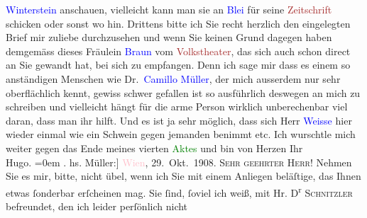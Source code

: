                   \textcolor{blue}{Winterstein}{}\ledrightnote{\textcolor{blue}{Alfred von Winterstein}} anschauen, vielleicht kann man sie
               an \textcolor{blue}{Blei}{}\ledrightnote{\textcolor{blue}{Franz Blei}} für seine \textcolor{brown}{Zeitschrift}{} schicken oder sonst wo hin. Drittens bitte ich
               Sie recht herzlich den eingelegten Brief mir zuliebe durchzusehen und wenn Sie keinen
               Grund dagegen haben demgemäss dieses Fräulein \textcolor{blue}{Braun}{}\ledrightnote{\textcolor{blue}{Thekla Maria Braun}} vom \textcolor{brown}{Volkstheater}{}\ledrightnote{\textcolor{brown}{Volkstheater}}, das sich auch schon
               direct an Sie gewandt hat, bei sich zu empfangen. Denn ich sage mir dass es einem so
               anständigen Menschen wie Dr. \textcolor{blue}{Camillo Müller}{}\ledrightnote{\textcolor{blue}{Camillo Müller}}, der
               mich ausserdem nur sehr oberflächlich kennt, gewiss schwer gefallen ist so
               ausführlich deswegen an mich zu schreiben und vielleicht hängt für die arme Person
               wirklich unberechenbar viel daran, dass man ihr hilft. Und es ist ja sehr möglich,
               dass sich Herr \textcolor{blue}{Weisse}{}\ledrightnote{\textcolor{blue}{Adolf Weisse}} hier wieder einmal wie ein
               Schwein gegen jemanden benimmt etc.\pend
           \pstart
           Ich wurschtle mich weiter gegen das Ende meines vierten \textcolor{green}{Aktes}{} und bin \pend
           \pstart
           von Herzen Ihr{\\[\baselineskip]}\spacefill\mbox{Hugo.}\pend
           \leftskip=0em{}\pstart
           \noindent{}\label{K_L01796_1v}\label{K_L01796_1h}.\pend
           {\bigskip}\pstart
           \raggedleft{}{\pb}{[}hs. Müller:{]} \textcolor{pink}{Wien}{}\ledrightnote{\textcolor{pink}{Wien}}, 29. Okt. 1908.\pend
           \pstart{}\textsc{Sehr geehrter Herr!}\pend\pstart
           Nehmen Sie es mir, bitte, nicht übel, wenn ich Sie mit einem Anliegen beläſtige, das
               Ihnen etwas ſonderbar erſcheinen mag.\pend
           \pstart
           Sie ſind, ſoviel ich weiß, mit Hr. D\textsuperscript{r}{ }\textsc{Schnitzler} befreundet, den ich leider perſönlich nicht
